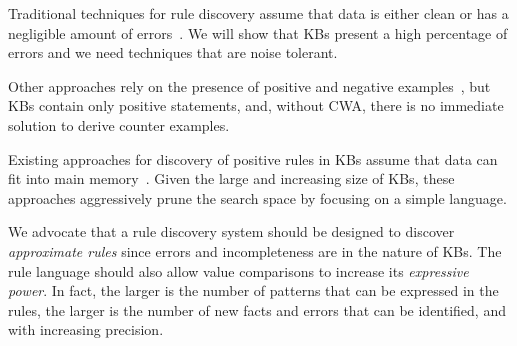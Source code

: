 \noindent {}
Traditional techniques for rule discovery assume that data is either clean or has a negligible amount of errors~\cite{abiteboul1995foundations,huhtala1999tane,wyss2001fastfds,chu2013discovering}. We will show that KBs present a high percentage of errors and we need techniques that are noise tolerant.

\noindent {}
Other approaches rely on the presence of positive and negative examples~\cite{dehaspe1999discovery,muggleton1994inductive}, but KBs contain only positive statements, and, without CWA, there is no immediate solution to derive %
counter examples.


\noindent {}
Existing approaches for discovery of positive rules in KBs assume that data can fit into main memory~\cite{abedjan2014amending,galarraga2015fast,Chen:2016,DBLP:conf/sigmod/FaridRIHC16}. Given the large and increasing size of KBs, these approaches aggressively prune the search space by focusing on a simple language.



We advocate that a rule discovery system should be designed to discover {\em approximate rules} since errors and incompleteness are in the nature of KBs. The rule language should also allow value comparisons to increase its {\em expressive power}.
In fact, the larger is the number of patterns that can be expressed in the rules, %
the larger is the number of new facts and errors that can be identified, and with increasing precision. 

